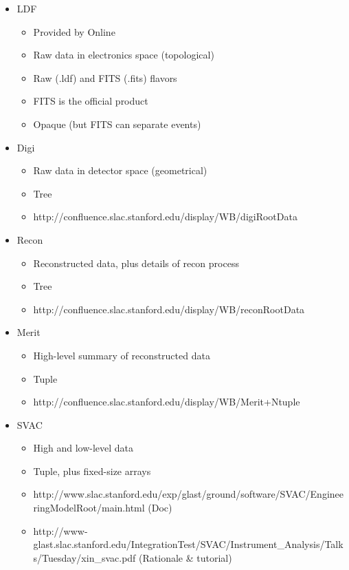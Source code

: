 \documentclass{article}
\begin{document}
\begin{itemize}

\item LDF
\begin{itemize}
\item Provided by Online
\item Raw data in electronics space (topological)
\item Raw (.ldf) and FITS (.fits) flavors
\item FITS is the official product
\item Opaque (but FITS can separate events)
\end{itemize}

\item Digi
\begin{itemize}
\item Raw data in detector space (geometrical)
\item Tree
\item http://confluence.slac.stanford.edu/display/WB/digiRootData
\end{itemize}

\item Recon
\begin{itemize}
\item Reconstructed data, plus details of recon process
\item Tree
\item http://confluence.slac.stanford.edu/display/WB/reconRootData
\end{itemize}

\item Merit
\begin{itemize}
\item High-level summary of reconstructed data
\item Tuple
\item http://confluence.slac.stanford.edu/display/WB/Merit+Ntuple
\end{itemize}

\item SVAC
\begin{itemize}
\item High and low-level data
\item Tuple, plus fixed-size arrays
\item http://www.slac.stanford.edu/exp/glast/ground/software/SVAC/EngineeringModelRoot/main.html (Doc)
\item http://www-glast.slac.stanford.edu/IntegrationTest/SVAC/Instrument\_Analysis/Talks/Tuesday/xin\_svac.pdf (Rationale \& tutorial)
\end{itemize}

\end{itemize}
\end{document}
